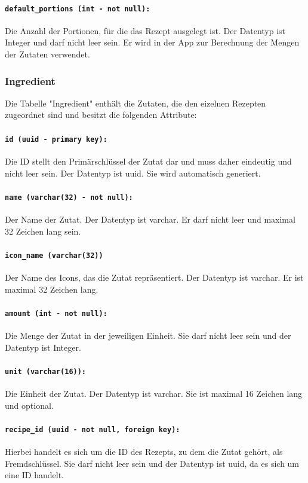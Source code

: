 \documentclass{entwurfsheft}
\begin{document}
\begin{sloppypar}
\paragraph{\texttt{default\_portions (int - not null):}} Die Anzahl der Portionen, für die das Rezept ausgelegt ist. Der Datentyp ist Integer und darf nicht leer sein. Er wird in der App zur Berechnung der Mengen der Zutaten verwendet.
\newpage
\subsubsection{Ingredient}
Die Tabelle "Ingredient" enthält die Zutaten, die den eizelnen Rezepten zugeordnet sind und besitzt die folgenden Attribute:
\paragraph{\texttt{id (uuid - primary key):}} Die ID stellt den Primärschlüssel der Zutat dar und muss daher eindeutig und nicht leer sein. Der Datentyp ist \Gls{uuid}. Sie wird automatisch generiert.
\paragraph{\texttt{name (varchar(32) - not null):}} Der Name der Zutat. Der Datentyp ist \Gls{varchar}. Er darf nicht leer und maximal 32 Zeichen lang sein.
\paragraph{\texttt{icon\_name (varchar(32))}} Der Name des Icons, das die Zutat repräsentiert. Der Datentyp ist \Gls{varchar}. Er ist maximal 32 Zeichen lang.
\paragraph{\texttt{amount (int - not null):}} Die Menge der Zutat in der jeweiligen Einheit. Sie darf nicht leer sein und der Datentyp ist Integer.
\paragraph{\texttt{unit (varchar(16)):}} Die Einheit der Zutat. Der Datentyp ist \Gls{varchar}. Sie ist maximal 16 Zeichen lang und optional.
\paragraph{\texttt{recipe\_id (uuid - not null, foreign key):}} Hierbei handelt es sich um die ID des Rezepts, zu dem die Zutat gehört, als Fremdschlüssel. Sie darf nicht leer sein und der Datentyp ist \Gls{uuid}, da es sich um eine ID handelt.
\newpage

\end{sloppypar}
\end{document}
